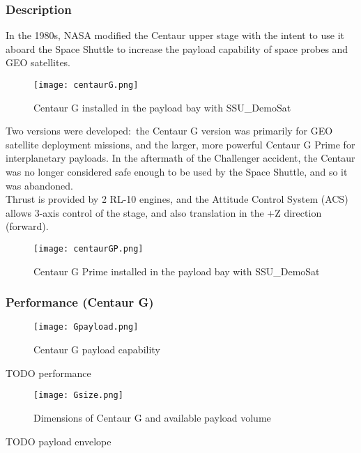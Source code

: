 \documentclass[Space_Shuttle_Ultra_Manual.tex]{subfiles}
\begin{document}
\begin{multicols*}{2}
\renewcommand{\cfttoctitlefont}{\bf}
\localtableofcontents
\subsubsection{Description}
\noindent
In the 1980s, NASA modified the Centaur upper stage with the intent to use it aboard the Space Shuttle to increase the payload capability of space probes and GEO satellites.

\begin{figure}[H]
	\centering
	\captionsetup{justification=centering}
  \texttt{[image: centaurG.png]}
  \caption{Centaur G installed in the payload bay with SSU\_DemoSat}
  \label{fig:centaurG}
\end{figure}

Two versions were developed$\colon$ the Centaur G version was primarily for GEO satellite deployment missions, and the larger, more powerful Centaur G Prime for interplanetary payloads. In the aftermath of the Challenger accident, the Centaur was no longer considered safe enough to be used by the Space Shuttle, and so it was abandoned.
\\
Thrust is provided by 2 RL-10 engines, and the Attitude Control System (ACS) allows 3-axis control of the stage, and also translation in the +Z direction (forward).

\begin{figure}[H]
	\centering
	\captionsetup{justification=centering}
  \texttt{[image: centaurGP.png]}
  \caption{Centaur G Prime installed in the payload bay with SSU\_DemoSat}
  \label{fig:centaurGP}
\end{figure}

\subsubsection{Performance (Centaur G)}
\begin{figure}[H]
	\centering
	\captionsetup{justification=centering}
  \texttt{[image: Gpayload.png]}
  \caption{Centaur G payload capability}
  \label{fig:Gpayload}
\end{figure}
TODO performance

\begin{figure}[H]
	\centering
	\captionsetup{justification=centering}
  \texttt{[image: Gsize.png]}
  \caption{Dimensions of Centaur G and available payload volume}
  \label{fig:Gsize}
\end{figure}
TODO payload envelope


\end{multicols*}
\end{document}
